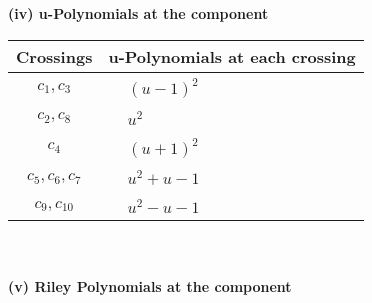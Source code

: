 \documentclass[1p]{elsarticle_modified}
\theoremstyle{definition}
\begin{document}
\newpage\renewcommand{\arraystretch}{1}
\flushleft \textbf{(iv) u-Polynomials at the component}\newline \\
\begin{tabular}{m{50pt}|m{274pt}}
Crossings & \hspace{64pt}u-Polynomials at each crossing \\
\hline $$\begin{aligned}c_{1},c_{3}\end{aligned}$$&$\begin{aligned}
&(u-1)^2
\end{aligned}$\\
\hline $$\begin{aligned}c_{2},c_{8}\end{aligned}$$&$\begin{aligned}
&u^2
\end{aligned}$\\
\hline $$\begin{aligned}c_{4}\end{aligned}$$&$\begin{aligned}
&(u+1)^2
\end{aligned}$\\
\hline $$\begin{aligned}c_{5},c_{6},c_{7}\end{aligned}$$&$\begin{aligned}
&u^2+u-1
\end{aligned}$\\
\hline $$\begin{aligned}c_{9},c_{10}\end{aligned}$$&$\begin{aligned}
&u^2- u-1
\end{aligned}$\\
\hline
\end{tabular}\\~\\
\newpage\renewcommand{\arraystretch}{1}
\flushleft \textbf{(v) Riley Polynomials at the component}\newline \\
\end{document}
